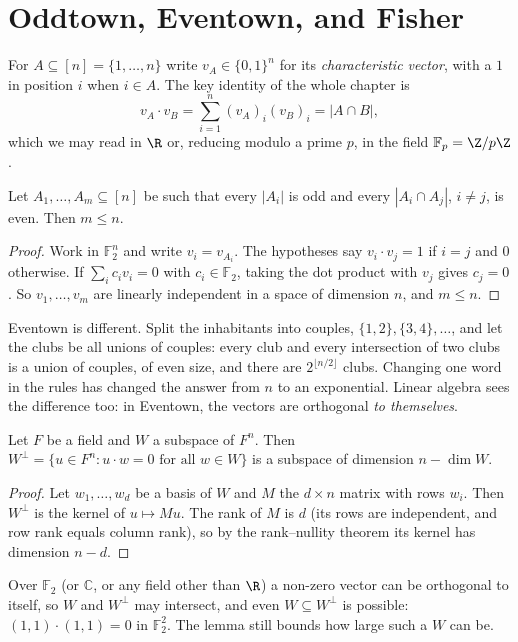 \section{Oddtown, Eventown, and Fisher}

For $A\subseteq[n]=\{1,\dots,n\}$ write $v_A\in\{0,1\}^n$ for its \emph{characteristic vector}, with a $1$ in position $i$ when $i\in A$. The key identity of the
whole chapter is
\[
v_A\cdot v_B=\sum_{i=1}^n(v_A)_i(v_B)_i=|A\cap B|,
\]
which we may read in $\R$ or, reducing modulo a prime $p$, in the field $\mathbb F_p=\Z/p\Z$.

\begin{theorem}\label{thm:oddtown}
Let $A_1,\dots,A_m\subseteq[n]$ be such that every $|A_i|$ is odd and every $|A_i\cap A_j|$, $i\ne j$, is even. Then $m\le n$.
\end{theorem}
\begin{proof}
Work in $\mathbb F_2^n$ and write $v_i=v_{A_i}$. The hypotheses say $v_i\cdot v_j=1$ if $i=j$ and $0$ otherwise. If $\sum_ic_iv_i=0$ with $c_i\in\mathbb F_2$, taking
the dot product with $v_j$ gives $c_j=0$. So $v_1,\dots,v_m$ are linearly independent in a space of dimension $n$, and $m\le n$.
\end{proof}

Eventown is different. Split the inhabitants into couples, $\{1,2\},\{3,4\},\dots$, and let the clubs be all unions of couples: every club and every
intersection of two clubs is a union of couples, of even size, and there are $2^{\lfloor n/2\rfloor}$ clubs. Changing one word in the rules has
changed the answer from $n$ to an exponential. Linear algebra sees the difference too: in Eventown, the vectors are orthogonal \emph{to themselves}.

\begin{lemma}\label{lem:perp}
Let $F$ be a field and $W$ a subspace of $F^n$. Then $W^\perp=\{u\in F^n:u\cdot w=0\text{ for all }w\in W\}$ is a subspace of dimension $n-\dim W$.
\end{lemma}
\begin{proof}
Let $w_1,\dots,w_d$ be a basis of $W$ and $M$ the $d\times n$ matrix with rows $w_i$. Then $W^\perp$ is the kernel of $u\mapsto Mu$. The rank of $M$ is $d$ (its rows are
independent, and row rank equals column rank), so by the rank--nullity theorem its kernel has dimension $n-d$.
\end{proof}

Over $\mathbb F_2$ (or $\mathbb C$, or any field other than $\R$) a non-zero vector can be orthogonal to itself, so $W$ and $W^\perp$ may intersect, and even
$W\subseteq W^\perp$ is possible: $(1,1)\cdot(1,1)=0$ in $\mathbb F_2^2$. The lemma still bounds how large such a $W$ can be.

